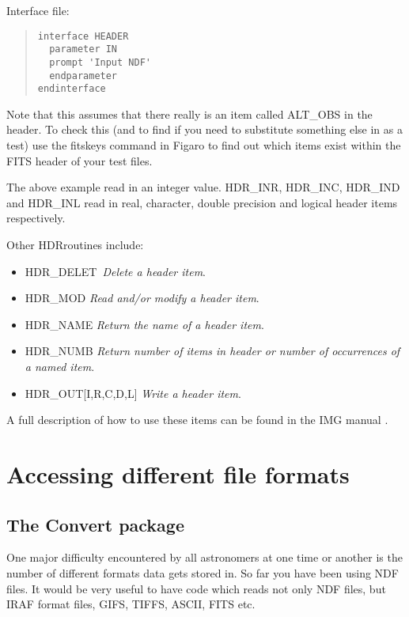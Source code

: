 Interface file:
  
\begin{quote}
{\small
\begin{verbatim}
interface HEADER
  parameter IN
  prompt 'Input NDF'
  endparameter
endinterface
\end{verbatim}
}
\end{quote}

Note that this assumes that there really is an item called {\sf ALT\_OBS}
in the header. To check this (and to find if you need to substitute
something else in as a test) use the {\sf fitskeys} command in {\sf
Figaro} to find out which items exist within the FITS header of your test
files. 

The above example read in an integer value.  {\sf HDR\_INR}, {\sf
HDR\_INC}, {\sf HDR\_IND} and {\sf HDR\_INL} read in real, character,
double precision and logical header items respectively. 

Other {\sf HDR}routines include:

\begin{itemize}
\item {\sf HDR\_DELET}\ {\em Delete a header item}.
\item {\sf HDR\_MOD} {\em Read and/or modify a header item}.
\item {\sf HDR\_NAME} {\em Return the name of a header item}.
\item {\sf HDR\_NUMB} {\em Return number of items in header or
number of occurrences of a named item}.
\item {\sf HDR\_OUT[I,R,C,D,L]} {\em Write a header item}.
\end{itemize}

A full description of how to use these items can be found in the IMG manual
.

\section{Accessing different file formats}

\subsection{The Convert package}

One major difficulty encountered by all astronomers at one time or another is
the number of different formats data gets stored in. So far you have been 
using NDF files. It would be very useful to have code which reads not 
only NDF files, but IRAF format files, GIFS, TIFFS, ASCII, FITS etc.

